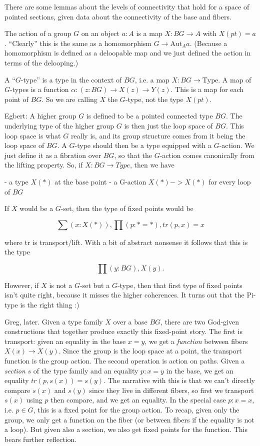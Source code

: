 \documentclass[12pt]{article}
\newcommand{\Aut}{\mathrm{Aut}}
\newcommand{\Type}{\mathrm{Type}}
\begin{document}
There are some lemmas about the levels of connectivity that hold for a space of pointed sections, given data about the connectivity of the base and fibers.

The action of a group $G$ on an object $a : A$ is a map $X: BG \to A$ with $X(pt) = a$. ``Clearly'' this is the same as a homomorphism $G \to \Aut_A a$. (Because a homomorphism is defined as a deloopable map and we just defined the action in terms of the delooping.)

A ``$G$-type'' is a type in the context of $BG$, i.e. a map $X : BG \to \Type$. A map of $G$-types is a function $\alpha : (z : BG) \to X(z) \to Y(z)$. This is a map for each point of $BG$. So we are calling $X$ the $G$-type, not the type $X(pt)$.

Egbert: A higher group $G$ is defined to be a pointed connected type $BG$. The underlying type of the higher group $G$ is then just the loop space of $BG$. This loop space is what $G$ really is, and its group structure comes from it being the loop space of $BG$. A $G$-type should then be a type equipped with a $G$-action. We just define it as a fibration over $BG$, so that the $G$-action comes canonically from the lifting property. So, if $X : BG \to Type$, then we have

- a type $X(*)$ at the base point
- a G-action $X(*) -> X(*)$ for every loop of $BG$

If $X$ would be a $G$-set, then the type of fixed points would be

$$\sum (x : X(*)), \prod (p : * = *), tr(p,x) = x$$

where tr is transport/lift. With a bit of abstract nonsense it follows that this is the type

$$\prod (y : BG), X(y).$$

However, if $X$ is not a $G$-set but a $G$-type, then that first type of fixed points isn't quite right, because it misses the higher coherences. It turns out that the Pi-type is the right thing :)

Greg, later. Given a type family $X$ over a base $BG$, there are two God-given constructions that together produce exactly this fixed-point story. The first is transport: given an equality in the base $x = y$, we get a \emph{function} between fibers $X(x)\to X(y)$. Since the group is the loop space at a point, the transport function is the group action. The second operation is action on paths. Given a \emph{section} $s$  of the type family and an equality $p : x = y$ in the base, we get an equality $tr(p, s(x)) = s(y)$. The narrative with this is that we can't directly compare $s(x)$ and $s(y)$ since they live in different fibers, so first we transport $s(x)$ using $p$ then compare, and we get an equality. In the special case $p : x = x$, i.e. $p \in G$, this is a fixed point for the group action. To recap, given only the group, we only get a function on the fiber (or between fibers if the equality is not a loop). But given also a section, we also get fixed points for the function. This bears further reflection.
\end{document}
